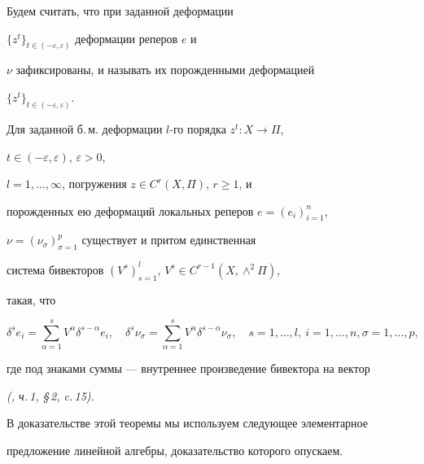 Будем считать, что при заданной деформации


$\{z^t\}_{t\in(-\varepsilon,\varepsilon)}$ деформации реперов $e$ и


$\nu$ зафиксированы, и называть их порожденными деформацией


$\{z^t\}_{t\in(-\varepsilon,\varepsilon)}$.





\begin{thm}


Для заданной б.\,м. деформации $l$-го порядка $z^t: X\to \Pi$,


$t\in (-\varepsilon,\varepsilon)$, $\varepsilon> 0$,


$l= 1,\dotsc,\infty$, погружения $z\in C^r(X,\Pi)$, $r\ge 1$, и


порожденных ею деформаций локальных реперов $e= (e_i)_{i=1}^n$,


$\nu= (\nu_{\sigma})_{\sigma=1}^p$ существует и притом единственная


система бивекторов $(V^s)_{s=1}^l$, $V^s\in C^{r-1}(X,\wedge^2\Pi)$,


такая, что


\begin{equation}


\delta^se_i=\sum_{\alpha=1}^{s}V^{\alpha}\delta^{s-\alpha}e_i,\quad


\delta^s\nu_{\sigma}=\sum_{\alpha=1}^{s}V^{\alpha}\delta^{s-\alpha}


\nu_{\sigma},\quad


s=1,\dotsc,l, \ i=1,\dotsc,n, \sigma=1,\dotsc,p,


\end{equation}


где под знаками суммы --- внутреннее произведение бивектора на вектор


{\em(\cite{Car2}, ч.\,1, \S\,2, c.\,15).}


\end{thm}





В доказательстве этой теоремы мы используем следующее элементарное


предложение линейной алгебры, доказательство которого опускаем.





